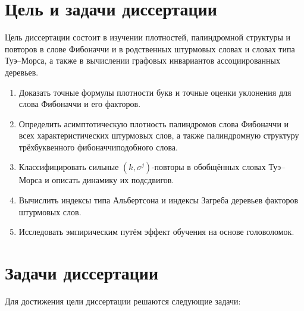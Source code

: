 \documentclass[a4paper,14pt]{extreport}
\theoremstyle{plain}
\theoremstyle{definition}
\theoremstyle{remark}
\begin{document}
	\section*{Цель и задачи диссертации}
	Цель диссертации состоит в изучении плотностей, палиндромной структуры и повторов в слове Фибоначчи и в родственных штурмовых словах и словах типа Туэ--Морса, а также в вычислении графовых инвариантов ассоциированных деревьев.
	\begin{enumerate}
		\item Доказать точные формулы плотности букв и точные оценки уклонения для слова Фибоначчи и его факторов.
		\item Определить асимптотическую плотность палиндромов слова Фибоначчи и всех характеристических штурмовых слов, а также палиндромную структуру трёхбуквенного фибоначчиподобного слова.
		\item Классифицировать сильные $(k,\sigma^j)$-повторы в обобщённых словах Туэ--Морса и описать динамику их подсдвигов.
		\item Вычислить индексы типа Альбертсона и индексы Загреба деревьев факторов штурмовых слов.
		\item Исследовать эмпирическим путём эффект обучения на основе головоломок.
	\end{enumerate}
	\section*{Задачи диссертации}
	
	Для достижения цели диссертации решаются следующие задачи:
	
\end{document}
